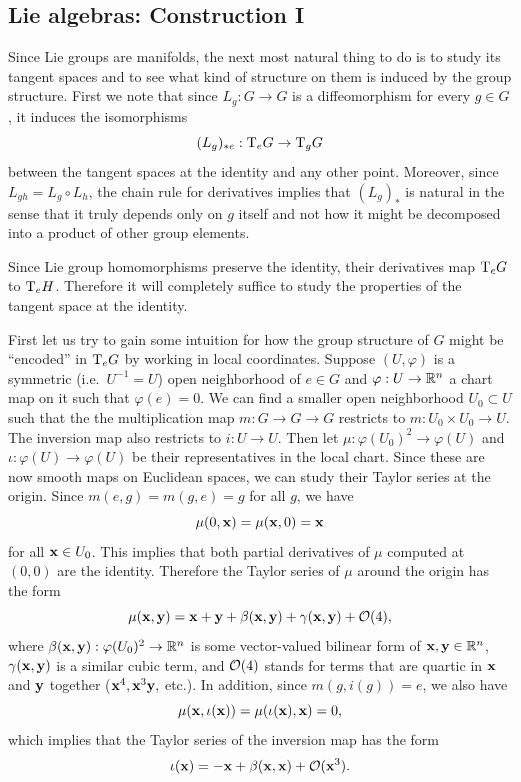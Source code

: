 \subsection{Lie algebras: Construction I}

Since Lie groups are manifolds, the next most natural thing to do is to study its tangent spaces and to see what kind of structure on them is induced by the group structure. 
First we note that since $L_g:G\to G$ is a diffeomorphism for every $g\in G$, it induces the isomorphisms
\[(L_g)_{\ast e}: \T_e G\to \T_g G\]
between the tangent spaces at the identity and any other point. Moreover, since $L_{gh}=L_g\circ L_h$, the chain rule for derivatives implies that $(L_g)_\ast$ is natural in the sense that it truly depends only on $g$ itself and not how it might be decomposed into a product of other group elements.

Since Lie group homomorphisms preserve the identity, their derivatives map $\T_e G$ to $\T_eH$. Therefore it will completely suffice to study the properties of the tangent space at the identity.


First let us try to gain some intuition for how the group structure of $G$ might be ``encoded'' in $\T_e G$ by working in local coordinates. Suppose $(U,\varphi)$ is a symmetric (i.e.~$U^{-1}=U$) open neighborhood of $e\in G$ and $\varphi:U\to \bbR^n$ a chart map on it such that $\varphi(e)=0$. We can find a smaller open neighborhood $U_0\subset U$ such that the the multiplication map $m:G\to G\to G$ restricts to $m:U_0\times U_0\to U$. The inversion map also restricts to $i:U\to U$. Then let $\mu:\varphi (U_0)^2\to \varphi(U)$ and $\iota:\varphi(U)\to \varphi(U)$ be their representatives in the local chart. Since these are now smooth maps on Euclidean spaces, we can study their Taylor series at the origin. Since $m(e,g)=m(g,e)=g$ for all $g$, we have
\[\mu(0,\bf{x})=\mu(\bf{x},0)=\bf{x}\]
for all $\bf{x}\in U_0$. This implies that both partial derivatives of $\mu$ computed at $(0,0)$ are the identity. Therefore the Taylor series of $\mu$ around the origin has the form
\[\mu(\bf{x},\bf{y})=\bf{x}+\bf{y}+\beta(\bf{x},\bf{y})+\gamma(\bf{x},\bf{y})+\calO(4),\]
where $\beta(\bf{x},\bf{y}):\varphi(U_0)^2\to \bbR^n$ is some vector-valued bilinear form of $\bf{x},\bf{y}\in\bbR^n$, $\gamma(\bf{x},\bf{y})$ is a similar cubic term, and $\calO(4)$ stands for terms that are quartic in $\bf{x}$ and $\bf{y}$ together ($\bf{x}^4, \bf{x}^3 \bf{y},$ etc.). In addition, since $m(g,i(g))=e$, we also have
\[\mu(\bf{x},\iota(\bf{x}))=\mu(\iota(\bf{x}),\bf{x})=0,\]
which implies that the Taylor series of the inversion map has the form
\[\iota(\bf{x})=-\bf{x}+\beta(\bf{x},\bf{x})+\calO(\bf{x}^3).\]

